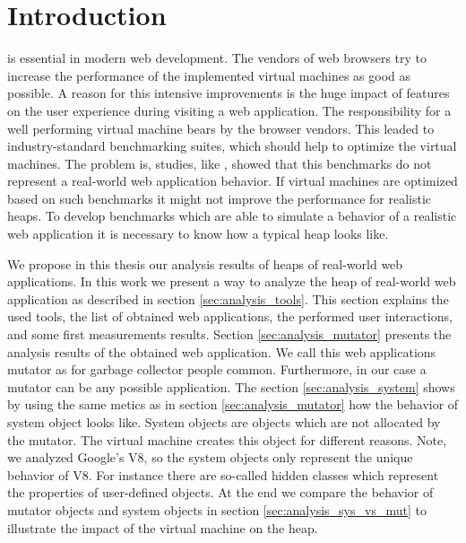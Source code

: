 
\section{Introduction}

\JS is essential in modern web development. The vendors of web browsers try to increase the performance of the implemented \JS virtual machines as good as possible. A reason for this intensive improvements is the huge impact of \JS features on the user experience during visiting a web application. The responsibility for a well performing \JS virtual machine bears by the browser vendors. This leaded to industry-standard benchmarking suites, which should help to optimize the \JS virtual machines. The problem is, studies, like \cite{JSMeter2009}, showed that this benchmarks do not represent a real-world web application behavior. If \JS virtual machines are optimized based on such benchmarks it might not improve the performance for realistic \JS heaps. To develop benchmarks which are able to simulate a behavior of a realistic web application it is necessary to know how a typical \JS heap looks like. 

We propose in this thesis our analysis results of \JS heaps of real-world web applications. In this work we present a way to analyze the heap of real-world web application as described in section \ref{sec:analysis_tools}. This section explains the used tools, the list of obtained web applications, the performed user interactions, and some first measurements results. Section \ref{sec:analysis_mutator} presents the analysis results of the obtained web application. We call this web applications mutator as for garbage collector people common. Furthermore, in our case a mutator can be any possible \JS application. The section \ref{sec:analysis_system} shows by using the same metics as in section \ref{sec:analysis_mutator} how the behavior of system object looks like. System objects are objects which are not allocated by the mutator. The virtual machine creates this object for different reasons. Note, we analyzed Google's V8, so the system objects only represent the unique behavior of V8. For instance there are so-called hidden classes which represent the properties of user-defined objects. At the end we compare the behavior of mutator objects and system objects in section \ref{sec:analysis_sys_vs_mut} to illustrate the impact of the virtual machine on the \JS heap.